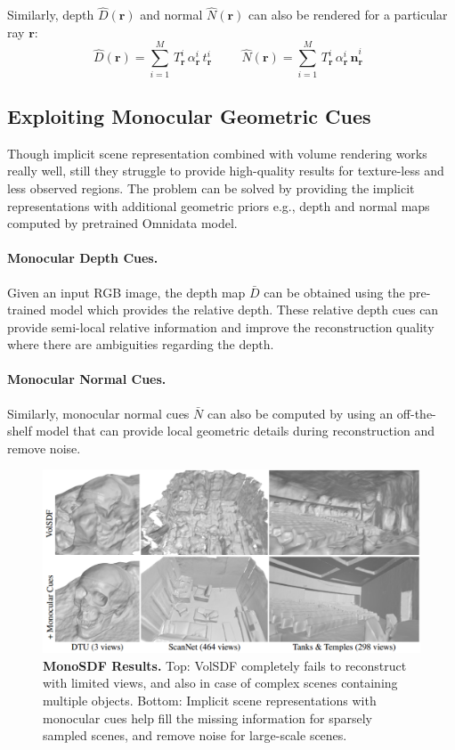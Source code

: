 \documentclass[a4paper]{paper}
\begin{document}
Similarly, depth $\hat{D}(\mathbf{r})$ and normal $\hat{N}(\mathbf{r})$ can also be rendered for a particular ray $\mathbf{r}$:
\begin{equation}
\hat{D}(\mathbf{r}) = \sum_{i=1}^M \, T_\mathbf{r}^i \, \alpha_\mathbf{r}^i \, t_\mathbf{r}^i \hspace{1cm}
\hat{N}(\mathbf{r}) = \sum_{i=1}^M \, T_\mathbf{r}^i \, \alpha_\mathbf{r}^i \, \hat{\mathbf{n}}_\mathbf{r}^i \enspace 
\label{volume_render_dn}
\end{equation}

\subsection{Exploiting Monocular Geometric Cues}\label{cues}
Though implicit scene representation combined with volume rendering works really well, still they struggle to provide high-quality results for texture-less and less observed regions. The problem can be solved by providing the implicit representations with additional geometric priors e.g., depth and normal maps computed by pretrained Omnidata \cite{eftekhar2021omnidata} model.
\paragraph{Monocular Depth Cues.} Given an input RGB image, the depth map $\bar{D}$ can be obtained using the pre-trained model which provides the relative depth. These relative depth cues can provide semi-local relative information and improve the reconstruction quality where there are ambiguities regarding the depth.
\paragraph{Monocular Normal Cues.} Similarly, monocular normal cues $\bar{N}$ can also be computed by using an off-the-shelf model that can provide local geometric details during reconstruction and remove noise.

\begin{figure}[!htb]
    \centering
    \includegraphics[width=\textwidth]{results}
    \caption{\textbf{MonoSDF Results.} Top: VolSDF completely fails to reconstruct with limited views, and also in case of complex scenes containing multiple objects. Bottom: Implicit scene representations with monocular cues help fill the missing information for sparsely sampled scenes, and remove noise for large-scale scenes.}
    \label{results}
    \vspace{-0.4cm}
\end{figure}
\end{document}

